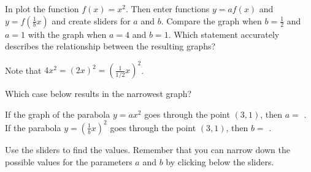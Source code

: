 \documentclass{ximera}
\begin{document}
\begin{question}
In  plot the function $f(x)=x^2$. Then enter functions $y=af(x)$ and $y=f\left(\frac{1}{b}x\right)$ and create sliders for $a$ and $b$. Compare the graph when $b=\frac{1}{2}$ and $a=1$ with the graph when $a=4$ and $b=1$. Which statement accurately describes the relationship between the resulting graphs?

    \begin{multipleChoice}
    \end{multipleChoice}
    \begin{hint}
    Note that $4x^2=(2x)^2=\left(\frac{1}{1/2}x\right)^2$.
    \end{hint}
Which case below results in the narrowest graph?
	\begin{multipleChoice}
    \end{multipleChoice}
    
If the graph of the parabola $y=ax^2$ goes through the point $(3,1)$, then $a=$ . If the parabola $y=\left(\frac{1}{b}x\right)^2$ goes through the point $(3,1)$, then $b=$ .  
	\begin{hint}
    Use the sliders to find the values. Remember that you can narrow down the possible values for the parameters $a$ and $b$ by clicking below the sliders.
    \end{hint}

\end{question}
\end{document}

